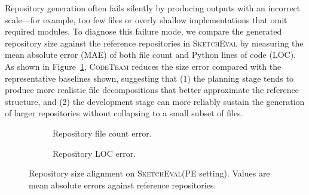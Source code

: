 \documentclass[format=acmsmall, review=false, screen=true]{acmart}
\newcommand{\tool}{\textsc{CodeTeam}\xspace}
\newcommand{\sketcheval}{\textsc{SketchEval}\xspace}
\begin{document}
Repository generation often fails silently by producing outputs with an incorrect scale---for example, too few files or overly shallow implementations that omit required modules.
To diagnose this failure mode, we compare the generated repository size against the reference repositories in \sketcheval by measuring the mean absolute error (MAE) of both file count and Python lines of code (LOC).
As shown in Figure~\ref{fig:rq1-size}, \tool reduces the size error compared with the representative baselines shown, suggesting that (1) the planning stage tends to produce more realistic file decompositions that better approximate the reference structure, and (2) the development stage can more reliably sustain the generation of larger repositories without collapsing to a small subset of files.

\begin{figure}[t]
\centering
\begin{subfigure}[t]{0.48\linewidth}
\centering
{}
\caption{Repository file count error.}
\end{subfigure}
\hfill
\begin{subfigure}[t]{0.48\linewidth}
\centering
{}
\caption{Repository LOC error.}
\end{subfigure}
\caption{Repository size alignment on \sketcheval (PE setting). Values are mean absolute errors against reference repositories.}
\label{fig:rq1-size}
\end{figure}
\end{document}
